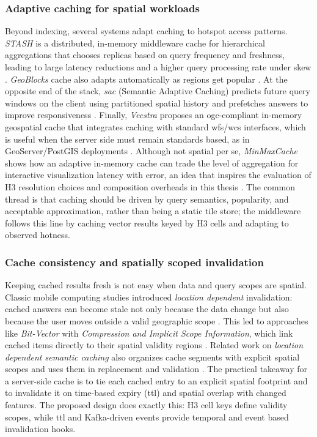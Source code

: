 \subsubsection{Adaptive caching for spatial workloads}
Beyond indexing, several systems adapt caching to hotspot access patterns. \emph{STASH} is a distributed, in-memory middleware cache for hierarchical aggregations that chooses replicas based on query frequency and freshness, leading to large latency reductions and a higher query processing rate under skew \cite{Mitra2019_STASH}. \emph{GeoBlocks} cache also adapts automatically as regions get popular \cite{Winter2021_GeoBlocks}. At the opposite end of the stack, \emph{\ac{sac}} (Semantic Adaptive Caching) predicts future query windows on the client using partitioned spatial history and prefetches answers to improve responsiveness \cite{Liu2013_SAC}. Finally, \emph{Vecstra} proposes an \ac{ogc}-compliant in-memory geospatial cache that integrates caching with standard \ac{wfs}/\ac{wcs} interfaces, which is useful when the server side must remain standards based, as in GeoServer/PostGIS deployments \cite{Wang2018_Vecstra}. Although not spatial per se, \emph{MinMaxCache} shows how an adaptive in-memory cache can trade the level of aggregation for interactive visualization latency with error, an idea that inspires the evaluation of H3 resolution choices and composition overheads in this thesis \cite{Maroulis2024_MinMaxCache}. The common thread is that caching should be driven by query semantics, popularity, and acceptable approximation, rather than being a static tile store; the middleware follows this line by caching vector results keyed by H3 cells and adapting to observed hotness.

\subsubsection{Cache consistency and spatially scoped invalidation}
Keeping cached results fresh is not easy when data and query scopes are spatial. Classic mobile computing studies introduced \emph{location dependent} invalidation: cached answers can become stale not only because the data change but also because the user moves outside a valid geographic scope \cite{Xu2003_TKDE_LocationInvalidation}. This led to approaches like \emph{Bit-Vector} with \emph{Compression and Implicit Scope Information}, which link cached items directly to their spatial validity regions \cite{Xu2003_TKDE_LocationInvalidation}. Related work on \emph{location dependent semantic caching} also organizes cache segments with explicit spatial scopes and uses them in replacement and validation \cite{Manica2005_LDSCM}. The practical takeaway for a server-side cache is to tie each cached entry to an explicit spatial footprint and to invalidate it on time-based expiry (\ac{ttl}) and spatial overlap with changed features. The proposed design does exactly this: H3 cell keys define validity scopes, while \ac{ttl} and Kafka-driven events provide temporal and event based invalidation hooks.

